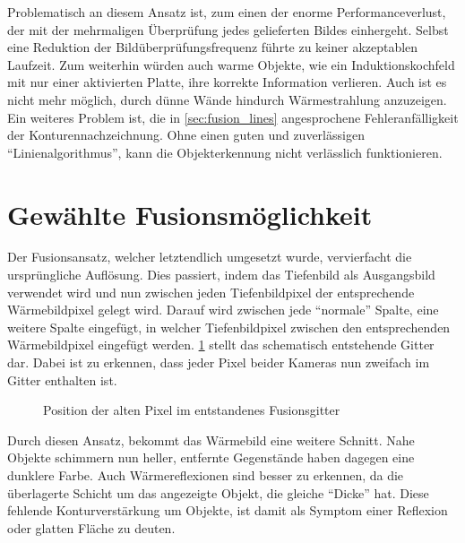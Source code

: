 Problematisch an diesem Ansatz ist, zum einen der enorme Performanceverlust, der mit der mehrmaligen Überprüfung jedes gelieferten Bildes einhergeht.
Selbst eine Reduktion der Bildüberprüfungsfrequenz führte zu keiner akzeptablen Laufzeit.
Zum weiterhin würden auch warme Objekte, wie \zB ein Induktionskochfeld mit nur einer aktivierten Platte, ihre korrekte Information verlieren.
Auch ist es nicht mehr möglich, durch dünne Wände hindurch Wärmestrahlung anzuzeigen.
Ein weiteres Problem ist, die in \cref{sec:fusion_lines} angesprochene Fehleranfälligkeit der Konturennachzeichnung.
Ohne einen guten und zuverlässigen \enquote{Linienalgorithmus}, kann die Objekterkennung nicht verlässlich funktionieren.

\section{Gewählte Fusionsmöglichkeit}
Der Fusionsansatz, welcher letztendlich umgesetzt wurde, vervierfacht die ursprüngliche Auflösung.
Dies passiert, indem das Tiefenbild als Ausgangsbild verwendet wird und nun zwischen jeden Tiefenbildpixel der entsprechende Wärmebildpixel gelegt wird.
Darauf wird zwischen jede \enquote{normale} Spalte, eine weitere Spalte eingefügt, in welcher Tiefenbildpixel zwischen den entsprechenden Wärmebildpixel eingefügt werden.
\cref{fig:fusion_pixel} stellt das schematisch entstehende Gitter dar.
Dabei ist zu erkennen, dass jeder Pixel beider Kameras nun zweifach im Gitter enthalten ist.
\begin{figure}[t]
	\centering
	\caption{Position der alten Pixel im entstandenes Fusionsgitter}
	\label{fig:fusion_pixel}
\end{figure}

Durch diesen Ansatz, bekommt das Wärmebild eine weitere Schnitt.
Nahe Objekte schimmern nun heller, entfernte Gegenstände haben dagegen eine dunklere Farbe.
Auch Wärmereflexionen sind besser zu erkennen, da die überlagerte Schicht um das angezeigte Objekt, die gleiche \enquote{Dicke} hat.
Diese fehlende Konturverstärkung um Objekte, ist damit als Symptom einer Reflexion oder glatten Fläche zu deuten.

